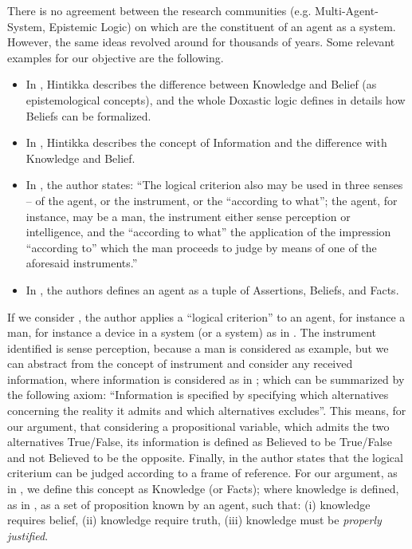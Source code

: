 There is no agreement between the research communities (e.g.
Multi-Agent-System, Epistemic Logic) on which are the constituent of an agent
as a system. However, the same ideas revolved around for thousands of years.
Some relevant examples for our objective are the following.
\begin{itemize}
	\item In \autocite{Hintikka1962knowledge}, Hintikka describes the
		difference between Knowledge and Belief (as epistemological
		concepts), and the whole Doxastic logic defines in details how
		Beliefs can be formalized.
	\item In \autocite{Hintikka1993Information}, Hintikka describes the concept
		of Information and the difference with Knowledge and Belief.
	\item In \autocite{Empiricus1990Pyrrhonism}, the author states: ``The
		logical criterion also may be used in three senses -- of the
		agent, or the instrument, or the ``according to what''; the
		agent, for instance, may be a man, the instrument either sense
		perception or intelligence, and the ``according to what'' the
		application of the impression ``according to'' which the man
		proceeds to judge by means of one of the aforesaid
		instruments.'' 
	\item In \autocite{Santaca2016abf}, the authors defines an agent as a
		tuple of Assertions, Beliefs, and Facts.
\end{itemize}

If we consider \autocite{Empiricus1990Pyrrhonism}, the author applies a
``logical criterion'' to an agent, for instance a man, for instance a device in
a system (or a system) as in \autocite{Santaca2016abf}.  The instrument identified is sense
perception, because a man is considered as example, but we can abstract from the
concept of instrument and consider any received information, where information is
considered as in \autocite{Hintikka1993Information}; which can be
summarized by the following axiom: ``Information is specified by specifying
which alternatives concerning the reality it admits and which alternatives
excludes''. This means, for our argument, that considering a propositional
variable, which admits the two alternatives True/False, its information is
defined as Believed to be True/False and not Believed to be the opposite. 
Finally, in \autocite{Empiricus1990Pyrrhonism}
the author states that the logical criterium can be judged according to a frame of reference.
For our argument, as in \autocite{Santaca2016abf}, we define this concept
as Knowledge (or Facts); where knowledge is defined, as in \autocite{Steup2020epistemology}, as
a set of proposition known by an agent, such that: (i) knowledge requires belief,
(ii) knowledge require truth, (iii) knowledge must be \emph{properly justified}.

